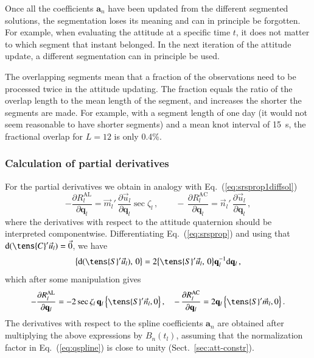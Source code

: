 \documentclass[structabstract]{aa}
\newcommand{\quat}[1]{\mathbf{#1}}
\begin{document}
Once all the coefficients $\quat{a}_n$ have been updated from the
different segmented solutions, the segmentation loses its meaning and
can in principle be forgotten. For example, when evaluating
the attitude at a specific time $t$, it does not matter to which segment
that instant belonged. In the next iteration of the attitude update, a
different segmentation can in principle be used.

The overlapping segments mean that a fraction of the observations
need to be processed twice in the attitude updating. The fraction equals
the ratio of the overlap length to the mean length of the segment, and
increases the shorter the segments are made. For example, with a segment
length of one day (it would not seem reasonable to have shorter segments)
and a mean knot interval of 15~s, the fractional overlap for $L=12$ is
only 0.4\%.


\subsubsection{Calculation of partial derivatives}\label{sec:att-pd}

For the partial derivatives we obtain in analogy with
Eq.~(\ref{eq:srsprop1diffsol})
\begin{equation}\label{eq:dRdq}
-\frac{\partial R_l^\text{AL}}{\partial\quat{q}_l} =
\vec{m}_l'\,\frac{\partial\vec{u}_l}{\partial\quat{q}_l}\sec\zeta_l \, ,
\quad\quad
-\,\frac{\partial R_l^\text{AC}}{\partial\quat{q}_l} =
\vec{n}_l'\,\frac{\partial\vec{u}_l}{\partial\quat{q}_l} \, ,
\end{equation}
where the derivatives with respect to the attitude quaternion should
be interpreted componentwise. Differentiating Eq.~(\ref{eq:srsprop})
and using that $\mbox{d}(\tens{C}'\vec{u}_l)=\vec{0}$, we have
\begin{equation}\label{eq:dodq}
\bigl\{\mbox{d}(\tens{S}'\vec{u}_l),\,0\bigr\}
= 2\bigl\{\tens{S}'\vec{u}_l,\,0\bigr\}\quat{q}_l^{-1}\mbox{d}\quat{q}_l\, ,
\end{equation}
which after some manipulation gives
\begin{equation}\label{eq:dfadq}
-\frac{\partial R_l^\text{AL}}{\partial\quat{q}_l}
= -2\sec\zeta_l\,\quat{q}_l\,\Bigl\{\tens{S}'\vec{n}_l,0\Bigr\}\, ,
\quad
-\,\frac{\partial R_l^\text{AC}}{\partial\quat{q}_l}
= 2\quat{q}_l\,\Bigl\{\tens{S}'\vec{m}_l,0\Bigr\}\, .
\end{equation}
The derivatives with respect to the spline coefficients $\quat{a}_n$ are
obtained after multiplying the above expressions by $B_n(t_l)$, assuming
that the normalization factor in Eq.~(\ref{eq:qspline}) is close to unity
(Sect.~\ref{sec:att-constr}).
\end{document}
